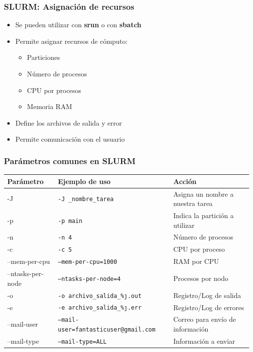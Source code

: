 \documentclass[aspectratio=169,professionalfonts]{beamer}
\begin{document}
\begin{frame}[fragile]
\frametitle{\textbf{SLURM: Asignación de recursos}}
\begin{itemize}
    \item Se pueden utilizar con \textbf{srun} o con \textbf{sbatch}
    \vspace{0.5em}
    \item Permite asignar recursos de cómputo:
    \vspace{0.5em}
    \begin{itemize}
        \item Particiones
        \item Número de procesos
        \item CPU por procesos
        \item Memoria RAM
    \end{itemize}
    \item Define los archivos de salida y error
    \vspace{0.5em}
    \item Permite comunicación con el usuario
\end{itemize}
    
\end{frame}


\begin{frame}[fragile]
\frametitle{\textbf{Parámetros comunes en SLURM}}
\scriptsize
{}
\begin{tabular}{|p{2.5cm}|p{5.5cm}|p{4.5cm}|}
\hline
\rowcolor{blue!20}
\textbf{Parámetro} & \textbf{Ejemplo de uso} & \textbf{Acción} \\
\hline
-J & \texttt{-J \_nombre\_tarea} & Asigna un nombre a nuestra tarea \\
-p & \texttt{-p main} & Indica la partición a utilizar \\
-n & \texttt{-n 4} & Número de procesos \\
-c & \texttt{-c 5} & CPU por proceso \\
--mem-per-cpu & \texttt{--mem-per-cpu=1000} & RAM por CPU \\
--ntasks-per-node & \texttt{--ntasks-per-node=4} & Procesos por nodo \\
-o & \texttt{-o archivo\_salida\_\%\j.out} & Registro/Log de salida \\
-e & \texttt{-e archivo\_salida\_\%\j.err} & Registro/Log de errores \\
--mail-user & \texttt{--mail-user=fantasticuser@gmail.com} & Correo para envío de información \\
--mail-type & \texttt{--mail-type=ALL} & Información a enviar \\
\hline
\end{tabular}
\end{frame}
\end{document}
